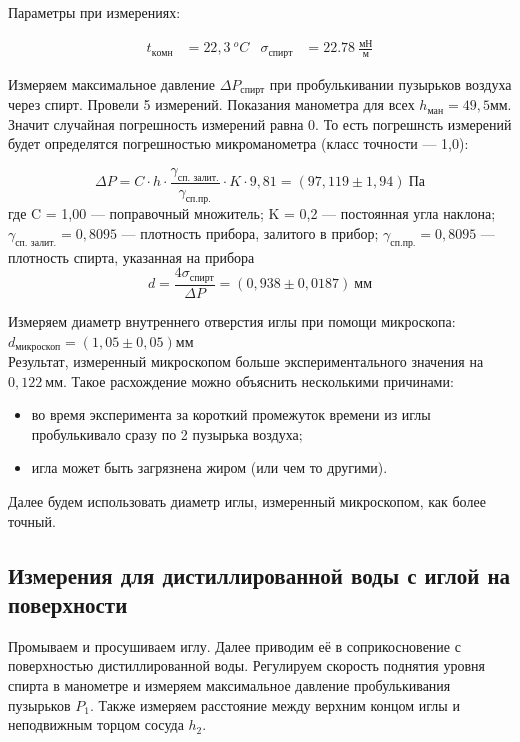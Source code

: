 \documentclass[a4paper,12pt]{article}
\begin{document}
			Параметры при измерениях:

			\begin{align*}
				t_{комн} &= 22,3~^oC & \sigma_{спирт} &= 22.78~\frac{\text{мН}}{\text{м}}
			\end{align*}

			Измеряем максимальное давление $\Delta P_{спирт}$ при пробулькивании пузырьков воздуха через спирт.
                Провели 5 измерений. Показания манометра для всех $h_{ман} = 49,5 \text{мм}$. Значит случайная погрешность измерений равна 0. То есть погрешнсть измерений будет определятся погрешностью микроманометра (класс точности --- 1,0):

                \[
                \Delta P = C \cdot h \cdot \frac{\gamma_{\text{сп. залит.}}}{\gamma_{\text{сп.пр.}}} \cdot K \cdot 9,81 = (97,119 \pm 1,94) \  \text{Па} 
                \]
                где C = 1,00 --- поправочный множитель; K = 0,2 --- постоянная угла наклона; $\gamma_{\text{сп. залит.}} = 0,8095$ --- плотность прибора, залитого в прибор; $\gamma_{\text{сп.пр.}} = 0,8095$ --- плотность спирта, указанная на прибора
                \[
                d = \frac{4 \sigma_{\text{спирт}}}{\Delta P} = (0,938 \pm 0,0187) \ \text{мм}
                \]


			Измеряем диаметр внутреннего отверстия иглы при помощи микроскопа: \\ $d_{\text{микроскоп}} = (1,05 \pm 0,05) \text{мм}$ \\

            Результат, измеренный микроскопом больше экспериментального значения на $0,122 \ \text{мм}$. Такое расхождение можно объяснить несколькими причинами:
			\begin{itemize}
				\item во время эксперимента за короткий промежуток времени из иглы пробулькивало сразу по 2 пузырька воздуха;
				\item игла может быть загрязнена жиром (или чем то другими).
			\end{itemize}
            Далее будем использовать диаметр иглы, измеренный микроскопом, как более точный.

            \subsection{Измерения для дистиллированной воды с иглой на поверхности}

			Промываем и просушиваем иглу. Далее приводим её в соприкосновение с поверхностью дистиллированной воды. Регулируем скорость поднятия уровня спирта в манометре и измеряем максимальное давление пробулькивания пузырьков $P_1$. Также измеряем расстояние между верхним концом иглы и неподвижным торцом сосуда $h_2$.
\end{document}
